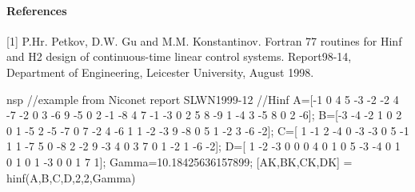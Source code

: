 \paragraph{References}
[1] P.Hr. Petkov, D.W. Gu and M.M. Konstantinov. Fortran 77 routines for Hinf and H2 design of continuous-time linear control systems.     Report98-14, Department of Engineering, Leicester University,     August 1998.
\begin{examples}
  \begin{mintednsp}{nsp}
    //example from Niconet report SLWN1999-12
    //Hinf
    A=[-1  0  4  5 -3 -2
      -2  4 -7 -2  0  3
      -6  9 -5  0  2 -1
      -8  4  7 -1 -3  0
      2  5  8 -9  1 -4
      3 -5  8  0  2 -6];
    B=[-3 -4 -2  1  0
      2  0  1 -5  2
      -5 -7  0  7 -2
      4 -6  1  1 -2
      -3  9 -8  0  5
      1 -2  3 -6 -2];
    C=[ 1 -1  2 -4  0 -3
      -3  0  5 -1  1  1
      -7  5  0 -8  2 -2
      9 -3  4  0  3  7
      0  1 -2  1 -6 -2];
    D=[ 1 -2 -3  0  0
      0  4  0  1  0
      5 -3 -4  0  1
      0  1  0  1 -3
      0  0  1  7  1];
    Gamma=10.18425636157899;
    [AK,BK,CK,DK] = hinf(A,B,C,D,2,2,Gamma)
  \end{mintednsp}
\end{examples}
\begin{manseealso}
\end{manseealso}
